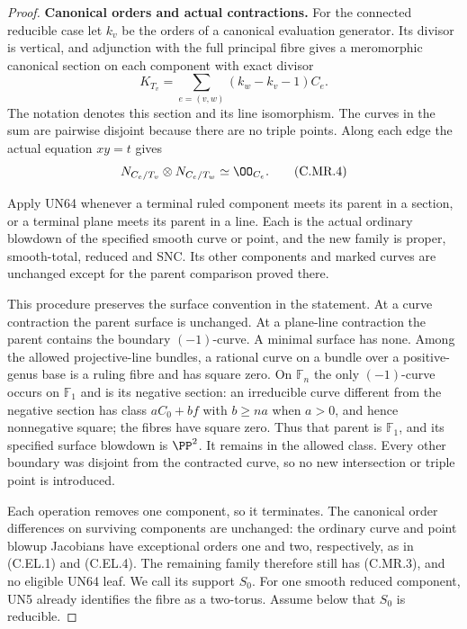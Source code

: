 \begin{proof}
\par\medskip\noindent\textbf{Canonical orders and actual contractions.}
For the connected reducible case let $k_v$ be the orders of
a canonical evaluation generator. Its divisor is vertical,
and adjunction with the full principal fibre gives a
meromorphic canonical section on each component with exact
divisor
\[
 K_{T_v}=
       \sum_{e=(v,w)}(k_w-k_v-1)C_e.
\tag{C.MR.3}
\]
The notation denotes this section and its line isomorphism.
The curves in the sum are pairwise disjoint because there
are no triple points. Along each edge the actual equation
$xy=t$ gives
\[
                 N_{C_e/T_v}\otimes N_{C_e/T_w}
                                        \simeq\OO_{C_e}.
\tag{C.MR.4}
\]

Apply UN64 whenever a terminal ruled component meets its
parent in a section, or a terminal plane meets its parent
in a line. Each is the actual ordinary blowdown of the
specified smooth curve or point, and the new family is
proper, smooth-total, reduced and SNC. Its other components
and marked curves are unchanged except for the parent
comparison proved there.

This procedure preserves the surface convention in the
statement. At a curve contraction the parent surface is
unchanged. At a plane-line contraction the parent contains
the boundary $(-1)$-curve. A minimal surface has none.
Among the allowed projective-line bundles, a rational
curve on a bundle over a positive-genus base is a ruling
fibre and has square zero. On $\mathbb F_n$ the only
$(-1)$-curve occurs on $\mathbb F_1$ and is its negative
section: an irreducible curve different from the negative
section has class $aC_0+bf$ with $b\ge na$ when $a>0$,
and hence nonnegative square; the fibres have square zero.
Thus that parent is $\mathbb F_1$, and its specified
surface blowdown is $\PP^2$. It remains in the allowed
class. Every other boundary was disjoint from the
contracted curve, so no new intersection or triple point
is introduced.

Each operation removes one component, so it terminates.
The canonical order differences on surviving components
are unchanged: the ordinary curve and point blowup
Jacobians have exceptional orders one and two,
respectively, as in (C.EL.1) and (C.EL.4). The remaining
family therefore still has (C.MR.3), and no eligible
UN64 leaf. We call its support $S_0$.
For one smooth reduced component, UN5 already identifies
the fibre as a two-torus. Assume below that $S_0$ is
reducible.


\end{proof}
